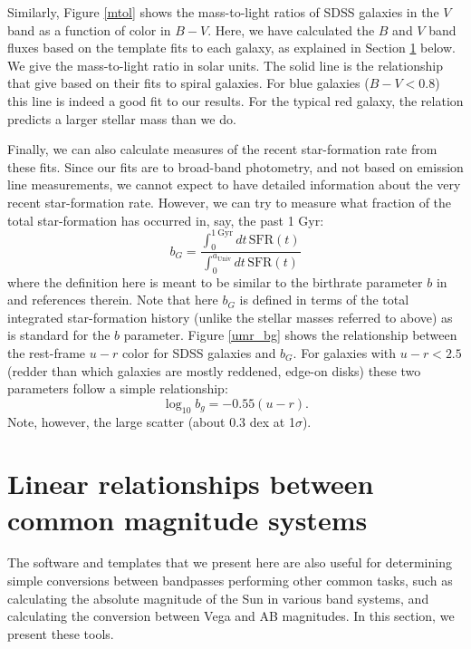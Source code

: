 \documentclass[10pt,preprint]{aastex}
\begin{document}
Similarly, Figure \ref{mtol} shows the mass-to-light ratios of SDSS
galaxies in the $V$ band as a function of color in $B-V$. Here, we
have calculated the $B$ and $V$ band fluxes based on the template fits
to each galaxy, as explained in Section \ref{sdss2bessell} below. We
give the mass-to-light ratio in solar units. The solid line is the
relationship that \citet{bell01b} give based on their fits to spiral
galaxies. For blue galaxies ($B-V < 0.8$) this line is indeed a good
fit to our results. For the typical red galaxy, the \citet{bell01b}
relation predicts a larger stellar mass than we do. 

Finally, we can also calculate measures of the recent star-formation
rate from these fits. Since our fits are to broad-band photometry, and
not based on emission line measurements, we cannot expect to have
detailed information about the very recent star-formation
rate. However, we can try to measure what fraction of the total
star-formation has occurred in, say, the past 1 Gyr:
\begin{equation}
b_{G} = \frac{\int_0^{1\mathrm{~Gyr}} dt\, \mathrm{SFR}(t)}
{\int_0^{a_{\mathrm{Univ}}} dt\, \mathrm{SFR}(t)}
\end{equation}
where the definition here is meant to be similar to the birthrate
parameter $b$ in \citet{kennicutt94a} and references therein.  Note
that here $b_G$ is defined in terms of the total integrated
star-formation history (unlike the stellar masses referred to above)
as is standard for the $b$ parameter. Figure \ref{umr_bg} shows the
relationship between the rest-frame $u-r$ color for SDSS galaxies and
$b_G$. For galaxies with $u-r < 2.5$ (redder than which galaxies are
mostly reddened, edge-on disks) these two parameters follow a simple
relationship:
\begin{equation}
\log_{10} b_g = -0.55 (u-r). 
\end{equation}
Note, however, the large scatter (about 0.3 dex at 1$\sigma$). 

\section{Linear relationships between common magnitude systems}
\label{sdss2bessell}

The software and templates that we present here are also useful for
determining simple conversions between bandpasses performing other
common tasks, such as calculating the absolute magnitude of the Sun in
various band systems, and calculating the conversion between Vega and
AB magnitudes. In this section, we present these tools.
\end{document}
